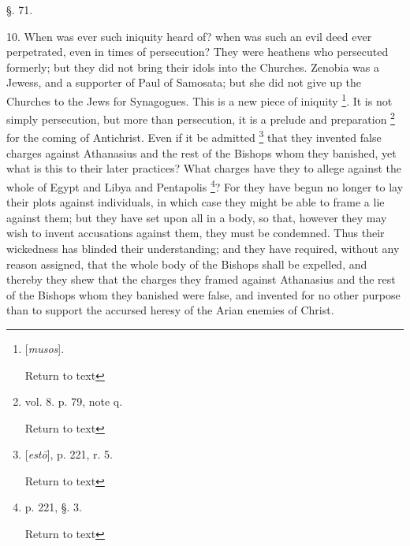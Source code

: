 §. 71.

10. When was ever such iniquity heard of? when
was such an evil deed ever perpetrated, even in times of persecution?
They were heathens who persecuted formerly; but they did not bring
their idols into the Churches. Zenobia was a Jewess, and a supporter
of Paul of Samosata; but she did not give up the Churches to the Jews
for Synagogues. This is a new piece of iniquity \footnote{[\emph{musos}].

Return to text}. It is not
simply persecution, but more than persecution, it is a prelude and
preparation \footnote{vol. 8. p. 79, note q.

Return to text} for the coming of Antichrist. Even if it be
admitted \footnote{[\emph{est\={o}}], p. 221, r. 5.

Return to text} that they invented false charges against Athanasius
and the rest of the Bishops whom they banished, yet what is this to
their later practices? What charges have they to allege against
the whole of Egypt and Libya and Pentapolis \footnote{p. 221, §. 3.

Return to text}? For they have
begun no longer to lay their plots against individuals, in which case
they might be able to frame a lie against them; but they have set upon
all in a body, so that, however they may wish to invent accusations
against them, they must be condemned. Thus their wickedness has
blinded their understanding; and they have required, without any
reason assigned, that the whole body of the Bishops shall be expelled,
and thereby they shew that the charges they framed against Athanasius
and the rest of the Bishops whom they banished were false, and
invented for no other purpose than to support the accursed heresy of
the Arian enemies of Christ.

